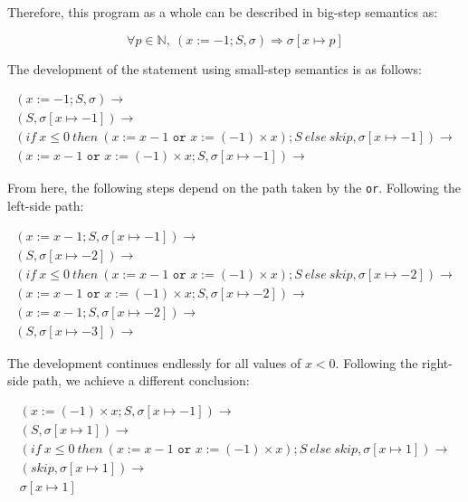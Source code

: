 \documentclass[11pt]{article}
\begin{document}
\begin{enumerate}
	Therefore, this program as a whole can be described in big-step semantics as:
	
	\begin{equation*}
		\forall p\in \mathbb{N},\ (x:= -1; S,\sigma) \Rightarrow \sigma[x\mapsto p]
	\end{equation*}
		
	The development of the statement using small-step semantics is as follows:
	
		\begin{align*}
		(x:=-1; S,\sigma) \rightarrow \\
		(S,\sigma[x\mapsto-1]) \rightarrow \\
		(if\ x\leq 0\ then\ (x:=x-1\texttt{ or }x:= (-1)\times x); S\ else\ skip,\sigma[x\mapsto-1]) \rightarrow \\
		(x:=x-1\texttt{ or }x:= (-1)\times x; S,\sigma[x\mapsto-1]) \rightarrow
		\end{align*}

		From here, the following steps depend on the path taken by the \texttt{or}. Following the left-side path:
		
		\begin{align*}
		(x:=x-1; S,\sigma[x\mapsto-1]) \rightarrow \\
		(S,\sigma[x\mapsto-2]) \rightarrow \\
		(if\ x\leq 0\ then\ (x:=x-1\texttt{ or }x:= (-1)\times x); S\ else\ skip,\sigma[x\mapsto-2]) \rightarrow\\
		(x:=x-1\texttt{ or }x:= (-1)\times x; S,\sigma[x\mapsto-2]) \rightarrow\\
		(x:=x-1; S,\sigma[x\mapsto-2]) \rightarrow \\
		(S,\sigma[x\mapsto-3]) \rightarrow
		\end{align*}
		
		The development continues endlessly for all values of $x < 0$. Following the right-side path, we achieve a different conclusion:
		
		\begin{align*}
		(x:=(-1)\times x; S,\sigma[x\mapsto-1]) \rightarrow \\
		(S,\sigma[x\mapsto1]) \rightarrow \\
		(if\ x\leq 0\ then\ (x:=x-1\texttt{ or }x:= (-1)\times x); S\ else\ skip,\sigma[x\mapsto1]) \rightarrow \\
		(skip,\sigma[x\mapsto1]) \rightarrow \\
		\sigma[x\mapsto 1]
		\end{align*}
		

\end{enumerate}
\end{document}

